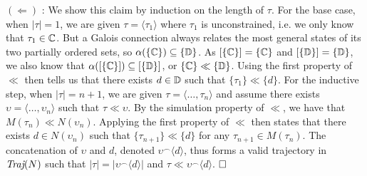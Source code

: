 
$(\Leftarrow)$ : We show this claim by induction on the length of $\tau$. For the base case, when $| \tau | = 1$, we are given $\tau = \langle \tau_{1} \rangle$ where $\tau_{1}$ is unconstrained, i.e. we only know that $\tau_{1} \in \mathbb{C}$. But a Galois connection always relates the most general states of its two partially ordered sets, so $\alpha(\{ \mathbb{C} \}) \subseteq \{ \mathbb{D} \}$. As $[\{ \mathbb{C} \}] = \{ \mathbb{C} \}$ and $[\{ \mathbb{D} \}] = \{ \mathbb{D} \}$, we also know that $\alpha([\{ \mathbb{C} \}]) \subseteq [\{ \mathbb{D} \}]$, or $\{ \mathbb{C} \} \ll \{ \mathbb{D} \}$. Using the first property of $\ll$ then tells us that there exists $d \in \mathbb{D}$ such that $\{ \tau_{1} \} \ll \{ d \}$. For the inductive step, when $| \tau | = n + 1$, we are given $\tau = \langle \dots , \tau_{n} \rangle$ and assume there exists $\upsilon = \langle \dots , \upsilon_{n} \rangle$ such that $\tau \ll \upsilon$. By the simulation property of $\ll$, we have that $M(\tau_{n}) \ll N(\upsilon_{n})$. Applying the first property of $\ll$ then states that there exists $d \in N(\upsilon_{n})$ such that $\{ \tau_{n+1} \} \ll \{ d \}$ for any $\tau_{n+1} \in M(\tau_{n})$. The concatenation of $\upsilon$ and $d$, denoted $\upsilon^{\frown}\langle d \rangle$, thus forms a valid trajectory in $\operatorname{\textit{Traj}}(N)$ such that $| \tau | = | \upsilon^{\frown}\langle d \rangle |$ and $\tau \ll \upsilon^{\frown}\langle d \rangle$. $\qedbox$

